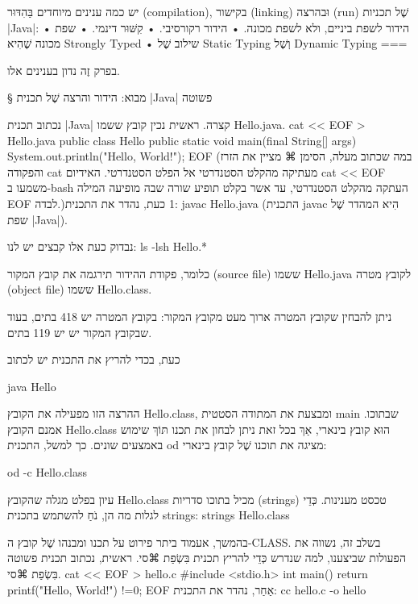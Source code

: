\def\Title{הידור והרצה של תכניות ג'אווה}

יש כמה ענינים מיוחדים בַּהִדּוּר (compilation), בקישור (linking) וּבהרצה (run)
שֶׁל תכניות  \E|Java|:
• הידור לשפת ביניים, ולא לשפת מכונה.
• הידור רקורסיבי.
• קִשּׁוּר דינמי.
• שפת מכונה שֶׁהִיא Strongly Typed
• שילוב שֶׁל Static Typing וְשֶׁל Dynamic Typing
===

בפרק זֶה נדון בענינים אלו.

§ מבוא: הידור והרצה שֶׁל תכנית \E|Java| פשוטה

נכתוב תכנית \E|Java| קצרה. ראשית נכין קובץ ששמו Hello.java.
cat << EOF > Hello.java
public class Hello {
  public static void main(final String[] args) {
    System.out.println("Hello, World!\n");
  }
}
EOF
\END
(במה שכתוב מעלה, הסימן ⌘
מציין את הזרז והפקודה cat מעתיקה מהקלט הסטנדרטי
אל הפלט הסטנדרטי. האידיום cat << EOF משמעו ב-bash העתקה מהקלט הסטנדרטי, עד
אשר בקלט תופיע שורה שבה מופיעה המילה EOF לבדה.)1
כעת, נהדר את התכנית:
javac Hello.java
\END
(התכנית javac הִיא המהדר שֶׁל שפת \E|Java|).

נבדוק כעת אלו קבצים יש לנו:
ls -lsh Hello.*
\END

כלומר, פקודת ההידור תירגמה את קובץ המקור (source file) ששמו Hello.java
לקובץ מטרה (object file) ששמו Hello.class.

ניתן להבחין שקובץ המטרה ארוך מעט מקובץ המקור: בקובץ המטרה יש
418 בתים, בעוד שבקובץ המקור יש יש 119 בתים.

כעת, בכדי להריץ את התכנית יש לכתוב

java Hello
\END

ההרצה הזו מפעילה את הקובץ Hello.class, ומבצעת את המתודה הסטטית main שבתוכו.
אמנם הקובץ Hello.class הוּא קובץ בינארי, אַךְ בכל זאת ניתן לבחון את תכנו תּוֹךְ שימוש
באמצעים שונים. כך למשל, התכנית od מציגה את תוכנו שֶׁל קובץ בינארי:

od -c Hello.class
\END

עיון בפלט מגלה שהקובץ Hello.class מכיל בתוכו סדריות (strings) טכסט מענינות.
כְּדֵי לגלות מה הן, נֹחַ להשתמש בתכנית strings:
strings Hello.class
\END

בהמשך, אעמוד ביתר פירוט על תכנו ומבנהו שֶׁל קובץ ה-CLASS. בשלב זה, נשווה את
הפעולות שביצענו, למה שנדרש כְּדֵי להריץ תכנית בִּשְׂפַת ⌘סי.
ראשית, נכתוב תכנית פשוטה בִּשְׂפַת ⌘סי.
cat << EOF > hello.c
#include <stdio.h>
int main() {
   return printf("Hello, World!\n") !=0;
}
EOF
\END
אַחַר, נהדר את התכנית:
cc hello.c -o hello
\END

